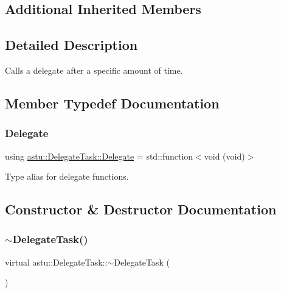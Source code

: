 \subsection*{Additional Inherited Members}


\subsection{Detailed Description}
Calls a delegate after a specific amount of time. 

\subsection{Member Typedef Documentation}
\mbox{\label{classastu_1_1DelegateTask_a74c7859178eb0889e884209d1604de4d}} 
\subsubsection{\texorpdfstring{Delegate}{Delegate}}
{\footnotesize\ttfamily using \hyperlink{classastu_1_1DelegateTask_a74c7859178eb0889e884209d1604de4d}{astu\+::\+Delegate\+Task\+::\+Delegate} =  std\+::function$<$void (void)$>$}

Type alias for delegate functions. 

\subsection{Constructor \& Destructor Documentation}
\mbox{\label{classastu_1_1DelegateTask_a948c5a93de18e5c9b6eafd247cdc849b}} 
\subsubsection{\texorpdfstring{$\sim$\+Delegate\+Task()}{~DelegateTask()}}
{\footnotesize\ttfamily virtual astu\+::\+Delegate\+Task\+::$\sim$\+Delegate\+Task (\begin{DoxyParamCaption}{ }\end{DoxyParamCaption})\hspace{0.3cm}{\ttfamily [virtual]}}

